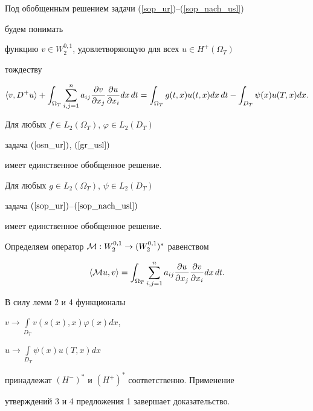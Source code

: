 Под обобщенным решением задачи (\ref{sop_ur})--(\ref{sop_nach_usl})


будем понимать


функцию $v \in W_2^{0,1}$, удовлетворяющую для всех $u \in H^+(\Omega_T)$


тождеству 


\begin{equation}


\label{sop_int_tozh}


\la v,D^+u\ra+\int_{\Omega_T}\sum_{i,j=1}^n a_{ij}


\frac{\partial v}{\partial x_j}


\frac{\partial u}{\partial x_i} dx\,dt=


\int_{\Omega_T}g(t,x)u(t,x) dx\,dt -


\int_{D_T} \psi(x)u(T,x)dx.


\end{equation} 





\begin{prop}


Для любых $f\in L_2(\Omega_T)$, $\varphi\in L_2(D_T)$


задача $(\ref{osn_ur})$, $(\ref{gr_usl})$


имеет единственное обобщенное решение.





Для любых $g\in L_2(\Omega_T)$, $\psi \in L_2(D_T)$ 


задача $(\ref{sop_ur})$--$(\ref{sop_nach_usl})$


имеет единственное обобщенное решение.


\end{prop}





\begin{pf} 


Определяем оператор ${\cal M}: W_2^{0,1} \to (W_2^{0,1})^*$ равенством


\begin{equation}


\la{\cal M}u, v\ra=\int_{\Omega_T} \sum_{i,j=1}^n a_{ij}


\frac{\partial u}{\partial x_j}


\frac{\partial v}{\partial x_i} dx\,dt.\label{2.9}


\end{equation}


В силу лемм 2 и 4 функционалы


$v\to\int\limits_{D_T} v(s(x),x) \varphi(x) dx$, 


$u \to \int\limits_{D_T} \psi(x)u(T,x) dx$


принадлежат $(H^-)^*$ и $(H^+)^*$ соответственно. Применение


утверждений 3 и 4 предложения 1 завершает доказательство.


\end{pf}





